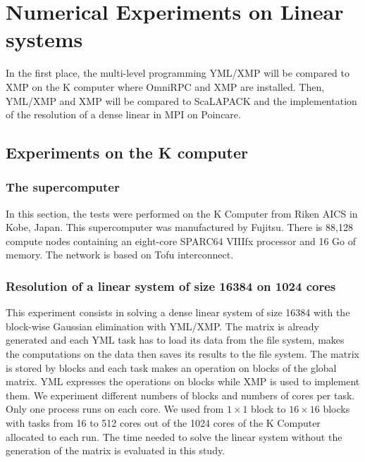 \section{Numerical Experiments on Linear systems}

In the first place, the multi-level programming YML/XMP will be compared to XMP on the K computer where OmniRPC and XMP are installed.
Then, YML/XMP and XMP will be compared to ScaLAPACK and the implementation of the resolution of a dense linear in MPI on Poincare.


\subsection{Experiments on the K computer}

\subsubsection{The supercomputer}
In this section, the tests were performed on the K Computer from Riken AICS in Kobe, Japan.
This supercomputer was manufactured by Fujitsu.
There is 88,128 compute nodes containing an eight-core SPARC64 VIIIfx processor and 16 Go of memory.
The network is based on Tofu interconnect.

\subsubsection{Resolution of a linear system of size 16384 on 1024 cores}
This experiment consists in solving a dense linear system of size 16384 with the block-wise Gaussian elimination with YML/XMP.
The matrix is already generated and each YML task has to load its data from the file system, makes the computations on the data then saves its results to the file system.
The matrix is stored by blocks and each task makes an operation on blocks of the global matrix.
YML expresses the operations on blocks while XMP is used to implement them.
We experiment different numbers of blocks and numbers of cores per task.
Only one process runs on each core.
We used from $1\times 1$ block to $16\times 16$ blocks with tasks from 16 to 512 cores out of the 1024 cores of the K Computer allocated to each run.
The time needed to solve the linear system without the generation of the matrix is evaluated in this study.

